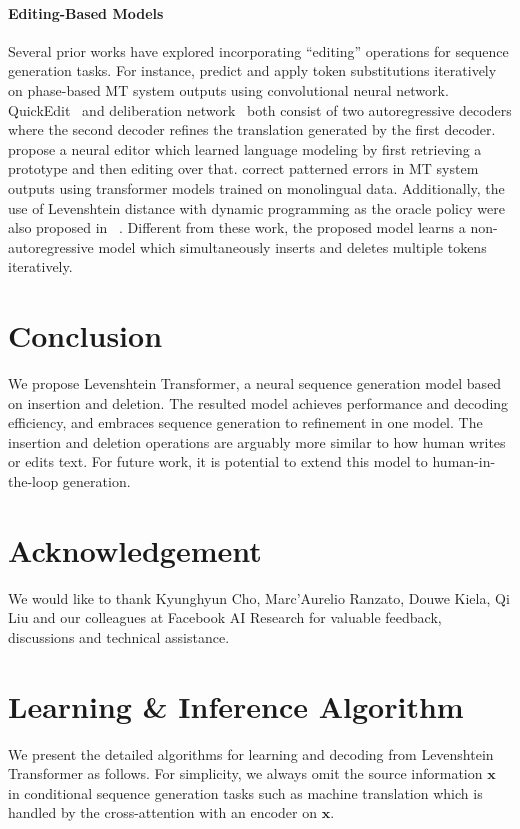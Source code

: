 \documentclass{article}
\begin{document}
\paragraph{Editing-Based Models} 
Several prior works have explored incorporating ``editing'' operations for sequence generation tasks. For instance,
\cite{novak2016iterative} predict and apply token substitutions iteratively on phase-based MT system outputs using convolutional neural network. QuickEdit~\citep{grangier2017quickedit} and deliberation network~\citep{xia2017deliberation} both consist of two autoregressive decoders where the second decoder refines the translation generated by the first decoder. \citet{guu2018generating} propose a neural editor which learned language modeling by first retrieving a prototype and then editing over that. \cite{freitag2019text} correct patterned errors in MT system outputs using transformer models trained on monolingual data.
Additionally, the use of Levenshtein distance with dynamic programming as the oracle policy were also proposed in ~\citet{sabour2018optimal,dong2019editnts}. Different from these work, the proposed model learns a non-autoregressive model which simultaneously inserts and deletes multiple tokens iteratively.


\section{Conclusion}
We propose Levenshtein Transformer, a neural sequence generation model based on insertion and deletion. The resulted model achieves performance and decoding efficiency, and embraces sequence generation to refinement in one model. 
The insertion and deletion operations are arguably more similar to how human writes or edits text. For future work, it is potential to extend this model to human-in-the-loop generation.

\section*{Acknowledgement}
We would like to thank Kyunghyun Cho, Marc'Aurelio Ranzato, Douwe Kiela, Qi Liu and our colleagues at Facebook AI Research for valuable feedback, discussions and technical assistance.



\newpage
\appendix
\section{Learning \& Inference Algorithm}
We present the detailed algorithms for learning and decoding from Levenshtein Transformer as follows. For simplicity, we always omit the source information $\bm{x}$ in conditional sequence generation tasks such as machine translation which is handled by the cross-attention with an encoder on $\bm{x}$.
\end{document}
